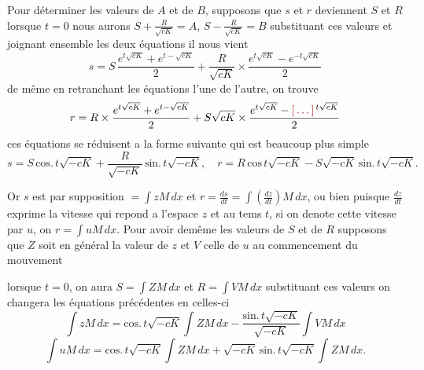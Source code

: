 \documentclass[11pt,a4paper]{article}
\begin{document}
Pour déterminer les valeurs de $A$ et de $B$, supposons que $s$ et $r$ deviennent
$S$ et $R$ lorsque $t=0$ nous aurons $S+\frac{R}{\sqrt{cK}}=A$, $S-\frac{R}{\sqrt{cK}}=B$ substituant
ces valeurs et joignant ensemble les deux équations il nous vient
\[ s=S\,\frac{e^{t\sqrt{cK}}+e^{t-\sqrt{cK}}}{2}+\frac{R}{\sqrt{cK}}\times\frac{e^{t\sqrt{cK}}-e^{-t\sqrt{cK}}}{2} \]
de même en retranchant les équations
l'une de l'autre, on trouve
\[ r=R\times\frac{e^{t\sqrt{cK}}+e^{t-\sqrt{cK}}}{2}+S\sqrt{cK}\times\frac{e^{t\sqrt{cK}}-\ill{}^{\,t\sqrt{cK}}}{2} \]
ces équations se réduisent a la forme suivante qui est beaucoup plus
simple
\[ s=S\,\text{cos.}\,t\sqrt{-cK}+\frac{R}{\sqrt{-cK}}\,\text{sin.}\,t\sqrt{-cK},\quad r=R\,\text{cos}\,t\sqrt{-cK}-S\sqrt{-cK}\,\text{sin.}\,t\sqrt{-cK}. \]

Or $s$ est par supposition $=\int zM\,dx$ et $r=\frac{ds}{dt}=\int\left(\frac{dz}{dt}\right)M\,dx$, ou bien
puisque $\frac{dz}{dt}$ exprime la vitesse qui repond a l'espace $z$ et au tems
$t$, si on denote cette vitesse par $u$, on $r=\int uM\,dx$. Pour avoir
demême les valeurs de $S$ et de $R$ supposons que $Z$ soit en général
la valeur de $z$ et $V$ celle de $u$ au commencement du mouvement



lorsque $t=0$, on aura $S=\int ZM\,dx$ et $R=\int VM\,dx$ substituant ces
valeurs on changera les équations précédentes en celles-ci
\[ \int zM\,dx=\text{cos.}\,t\sqrt{-cK}\int ZM\,dx-\frac{\text{sin.}\,t\sqrt{-cK}}{\sqrt{-cK}}\int VM\,dx \]
\[ \int uM\,dx=\text{cos.}\,t\sqrt{-cK}\int ZM\,dx+\sqrt{-cK}\,\text{sin.}\,t\sqrt{-cK}\int ZM\,dx. \]
\end{document}
